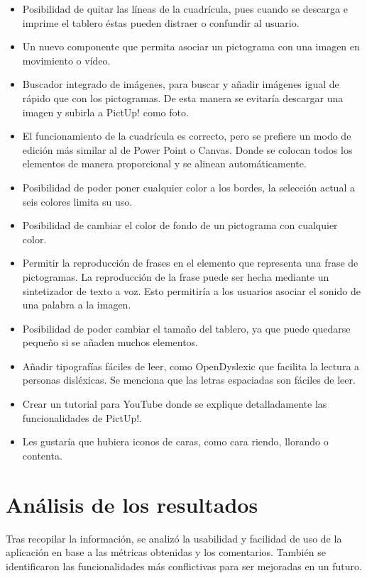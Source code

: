 \begin{itemize}
	\item Posibilidad de quitar las líneas de la cuadrícula, pues cuando se descarga e imprime el tablero éstas pueden distraer o confundir al usuario.  
	\item Un nuevo componente que permita asociar un pictograma con una imagen en movimiento o vídeo.
	\item Buscador integrado de imágenes, para buscar y añadir imágenes igual de rápido que con los pictogramas. De esta manera se evitaría descargar una imagen y subirla a PictUp! como foto. 
	\item El funcionamiento de la cuadrícula es correcto, pero se prefiere un modo de edición más similar al de Power Point o Canvas. Donde se colocan todos los elementos de manera proporcional y se alinean automáticamente.
	\item Posibilidad de poder poner cualquier color a los bordes, la selección actual a seis colores limita su uso.
	\item Posibilidad de cambiar el color de fondo de un pictograma con cualquier color. 
	\item Permitir la reproducción de frases en el elemento que representa una frase de pictogramas. La reproducción de la frase puede ser hecha mediante un sintetizador de texto a voz. Esto permitiría a los usuarios asociar el sonido de una palabra a la imagen.
	\item Posibilidad de poder cambiar el tamaño del tablero, ya que puede quedarse pequeño si se añaden muchos elementos.
	\item Añadir tipografías fáciles de leer, como OpenDyslexic que facilita la lectura a personas disléxicas. Se menciona que las letras espaciadas son fáciles de leer. 
	\item Crear un tutorial para YouTube donde se explique detalladamente las funcionalidades de PictUp!. 
	\item Les gustaría que hubiera iconos de caras, como cara riendo, llorando o contenta. 
\end{itemize}






\section{Análisis de los resultados}
\label{eva:analisis}


Tras recopilar la información, se analizó la usabilidad y facilidad de uso de la aplicación en base a las métricas obtenidas y los comentarios. También se identificaron las funcionalidades más conflictivas para ser mejoradas en un futuro. 

